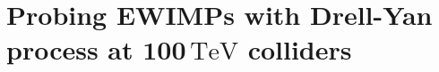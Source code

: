 \documentclass[12pt,twoside,book]{article}
\begin{document}

\section[Probing EWIMPs with Drell-Yan process at $100\,\mathrm{TeV}$ colliders]{Probing EWIMPs with Drell-Yan process at $\bm{100\,\mathrm{TeV}}$ colliders}
\setcounter{equation}{0}
\end{document}
